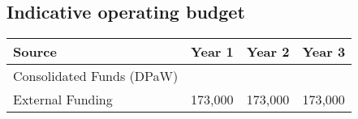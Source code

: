 \documentclass[version=last,
    paper=a4, %
    10pt, %
    usenames,
    dvipsnames,
    oneside, %
    headings=openany, %
    DIV=15 %
]{scrbook}
\begin{document}
\subsection*{Indicative operating budget }



\begin{longtabu} to \linewidth { |  X | X | X | X | }
\hline
{}
Source & Year 1 & Year 2 & Year 3\\
\hline
\endhead



Consolidated Funds (DPaW) &  &  & \\



External Funding & 173,000 & 173,000 & 173,000\\


\hline
\end{longtabu}






\end{document}
